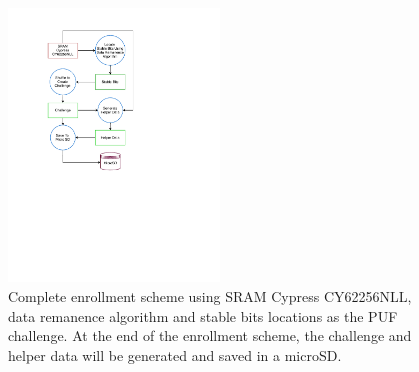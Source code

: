 \begin{figure}[tph!]
    \centerline{\includegraphics[width={0.5\textwidth}]{images/enrollment}}
    \caption{Complete enrollment scheme using SRAM Cypress CY62256NLL, data remanence algorithm and stable bits locations as the PUF challenge. At the end of the enrollment scheme, the challenge and helper data will be generated and saved in a microSD.}
    \label{fig:enrollment}
\end{figure}

